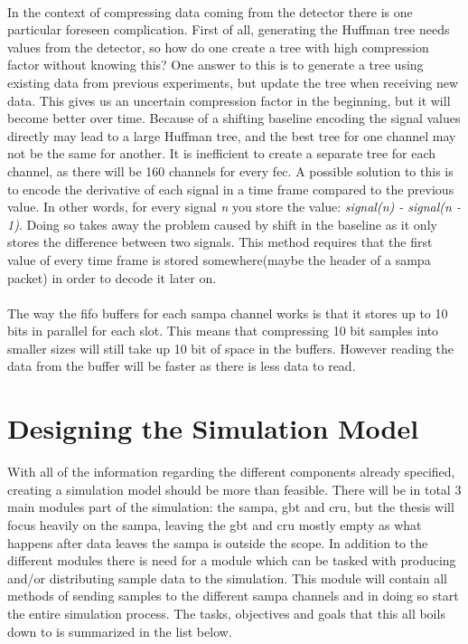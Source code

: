 \documentclass[a4paper, 12pt, openright, twoside]{report}
\begin{document}
\paragraph{}
In the context of compressing data coming from the detector there is one particular foreseen complication.
First of all, generating the Huffman tree needs values from the detector, so how do one create a tree with high compression factor without knowing this?
One answer to this is to generate a tree using existing data from previous experiments, but update the tree when receiving new data.
This gives us an uncertain compression factor in the beginning, but it will become better over time.
Because of a shifting baseline encoding the signal values directly may lead to a large Huffman tree, and the best tree for one channel may not be the same for another.
It is inefficient to create a separate tree for each channel, as there will be 160 channels for every \gls{fec}.
A possible solution to this is to encode the derivative of each signal in a time frame compared to the previous value.
In other words, for every signal \textit{n} you store the value: \textit{signal(n) - signal(n - 1)}.
Doing so takes away the problem caused by shift in the baseline as it only stores the difference between two signals.
This method requires that the first value of every time frame is stored somewhere(maybe the header of a \gls{sampa} packet) in order to decode it later on.


\paragraph{}
The way the \gls{fifo} buffers for each \gls{sampa} channel works is that it stores up to 10 bits in parallel for each slot.
This means that compressing 10 bit samples into smaller sizes will still take up 10 bit of space in the buffers. 
However reading the data from the buffer will be faster as there is less data to read.

\section{Designing the Simulation Model}
With all of the information regarding the different components already specified, creating a simulation model should be more than feasible.
There will be in total 3 main modules part of the simulation: the \gls{sampa}, \gls{gbt} and \gls{cru}, but the thesis will focus heavily on the \gls{sampa}, leaving the \gls{gbt} and \gls{cru} mostly empty as what happens after data leaves the \gls{sampa} is outside the scope.
In addition to the different modules there is need for a module which can be tasked with producing and/or distributing sample data to the simulation.
This module will contain all methods of sending samples to the different \gls{sampa} channels and in doing so start the entire simulation process.
The tasks, objectives and goals that this all boils down to is summarized in the list below.
\end{document}
